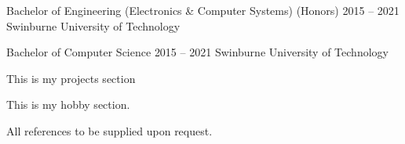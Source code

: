 \documentclass[9pt]{extarticle}
\begin{document}
\cvbreak


\begin{minipage}[t]{\textwidth}
	\vspace{-\baselineskip}

	\cveducation
		{Bachelor of Engineering (Electronics \& Computer Systems) \normalfont(Honors)}
		{2015 -- 2021}
		{Swinburne University of Technology}

	\cveducation
		{Bachelor of Computer Science}
		{2015 -- 2021}
		{Swinburne University of Technology}
\end{minipage}

\cvbreak


\begin{minipage}[t]{0.3\textwidth}
	\vspace{-\baselineskip}

	This is my projects section
\end{minipage}
\hfill
\begin{minipage}[t]{0.3\textwidth}
	\vspace{-\baselineskip}

	This is my hobby section.
\end{minipage}
\hfill
\begin{minipage}[t]{0.3\textwidth}
	\vspace{-\baselineskip}

	All references to be supplied upon request.
\end{minipage}
\end{document}
